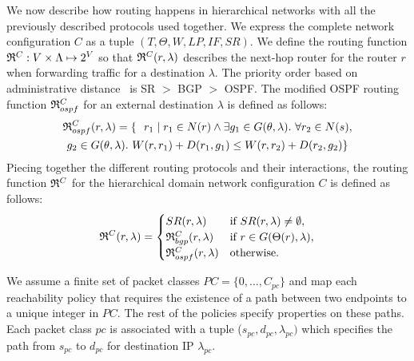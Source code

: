  We now describe how routing
happens in hierarchical networks with all the previously described protocols
used together.
We express the complete network configuration $C$
as a tuple $(T, \Theta,W,LP,IF,SR)$.
We define the routing function 
$\mathfrak{R}^C: V \times \Lambda \mapsto 2^V$ 
so that
$\mathfrak{R}^C(r,\lambda)$
 describes the next-hop router for the 
router $r$ when forwarding traffic for a destination $\lambda$. 
The priority order based on administrative distance~\cite{admindistance} is 
SR $>$ BGP $>$ OSPF. 
\iffull
The modified OSPF routing 
function $\mathfrak{R}^C_{ospf}$ for an external destination $\lambda$
is defined as follows: 
\begin{multline*}
\mathfrak{R}_{ospf}^C(r,\lambda) = \{~~r_1 \mid r_1 \in N(r) \wedge \exists g_1 \in G (\theta, \lambda). ~\forall r_2 \in N(s), \\ g_2 \in G (\theta, \lambda). ~W(r, r_1) + D(r_1, g_1) \leq
W(r, r_2) + D(r_2, g_2)\}
\end{multline*}
\fi
Piecing together the different routing protocols and their 
interactions, the routing function 
$\mathfrak{R}^C$ for the hierarchical domain network configuration $C$ is defined as follows: 
\[
\mathfrak{R}^C(r, \lambda) = 
\begin{cases}
SR(r, \lambda) & \text{if } SR(r, \lambda) \not= \emptyset, \\
\mathfrak{R}_{bgp}^C(r, \lambda) & \text{if }r \in G(\Theta(r), \lambda), \\
\mathfrak{R}_{ospf}^C(r, \lambda) & \text{otherwise.} 
\end{cases}
\]

We assume a finite set of packet classes $PC = \{0, \ldots, C_{pc}\}$ 
and map each reachability
policy that requires the existence of a path between two endpoints
to a unique integer in $PC$. The rest of the policies specify 
properties on these paths. Each packet class $pc$ is associated
with a tuple ($s_{pc}, d_{pc}, \lambda_{pc})$ which specifies 
the path from $s_{pc}$ to $d_{pc}$ for destination IP $\lambda_{pc}$.


